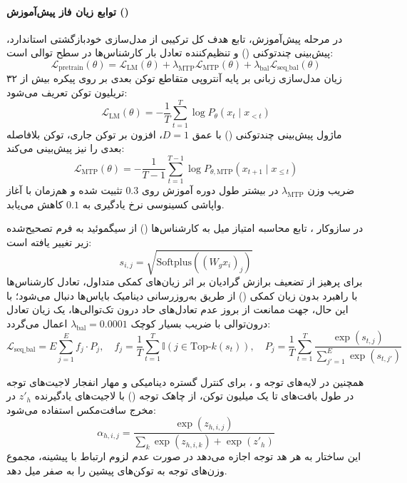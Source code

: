 \paragraph*{توابع زیان فاز پیش‌آموزش ()}
در مرحله پیش‌آموزش، تابع هدف کل ترکیبی از مدل‌سازی خودبازگشتی استاندارد، پیش‌بینی چندتوکنی () و تنظیم‌کننده تعادل بار کارشناس‌ها در سطح توالی است:
\begin{equation}
    \mathcal{L}_{\text{pretrain}}(\theta) = \mathcal{L}_{\text{LM}}(\theta) + \lambda_{\text{MTP}} \mathcal{L}_{\text{MTP}}(\theta) + \lambda_{\text{bal}} \mathcal{L}_{\text{seq\_bal}}(\theta)
\end{equation}
زیان مدل‌سازی زبانی بر پایه آنتروپی متقاطع توکن بعدی بر روی پیکره بیش از ۳۲ تریلیون توکن تعریف می‌شود:
\begin{equation}
    \mathcal{L}_{\text{LM}}(\theta) = - \frac{1}{T} \sum_{t=1}^{T} \log P_\theta(x_t \mid x_{<t})
\end{equation}
ماژول پیش‌بینی چندتوکنی () با عمق $D=1$، افزون بر توکن جاری، توکن بلافاصله بعدی را نیز پیش‌بینی می‌کند:
\begin{equation}
    \mathcal{L}_{\text{MTP}}(\theta) = - \frac{1}{T-1} \sum_{t=1}^{T-1} \log P_{\theta,\text{MTP}}(x_{t+1} \mid x_{\le t})
\end{equation}
ضریب وزن $\lambda_{\text{MTP}}$ در بیشتر طول دوره آموزش روی $0.3$ تثبیت شده و هم‌زمان با آغاز واپاشی کسینوسی نرخ یادگیری به $0.1$ کاهش می‌یابد.

در سازوکار ، تابع محاسبه امتیاز میل به کارشناس‌ها () از سیگموئید به فرم تصحیح‌شده زیر تغییر یافته است:
\begin{equation}
    s_{i,j} = \sqrt{\text{Softplus}\left( (W_g x_i)_j \right)}
\end{equation}
برای پرهیز از تضعیف برازش گرادیان بر اثر زیان‌های کمکی متداول، تعادل کارشناس‌ها با راهبرد بدون زیان کمکی () از طریق به‌روزرسانی دینامیک بایاس‌ها دنبال می‌شود؛ با این حال، جهت ممانعت از بروز عدم تعادل‌های حاد درون تک‌توالی‌ها، یک زیان تعادل درون‌توالی با ضریب بسیار کوچک $\lambda_{\text{bal}} = 0.0001$ اعمال می‌گردد:
\begin{equation}
    \mathcal{L}_{\text{seq\_bal}} = E \sum_{j=1}^{E} f_j \cdot P_j, \quad f_j = \frac{1}{T} \sum_{t=1}^T \mathbb{I}(j \in \text{Top-}k(s_{t})), \quad P_j = \frac{1}{T} \sum_{t=1}^T \frac{\exp(s_{t,j})}{\sum_{j'=1}^E \exp(s_{t,j'})}
\end{equation}

همچنین در لایه‌های توجه  و ، برای کنترل گستره دینامیکی و مهار انفجار لاجیت‌های توجه در طول بافت‌های تا یک میلیون توکن، از چاهک توجه () با لاجیت‌های یادگیرنده $z'_h$ در مخرج سافت‌مکس استفاده می‌شود:
\begin{equation}
    \alpha_{h,i,j} = \frac{\exp(z_{h,i,j})}{\sum_{k} \exp(z_{h,i,k}) + \exp(z'_h)}
\end{equation}
این ساختار به هر هد توجه اجازه می‌دهد در صورت عدم لزوم ارتباط با پیشینه، مجموع وزن‌های توجه به توکن‌های پیشین را به صفر میل دهد.

